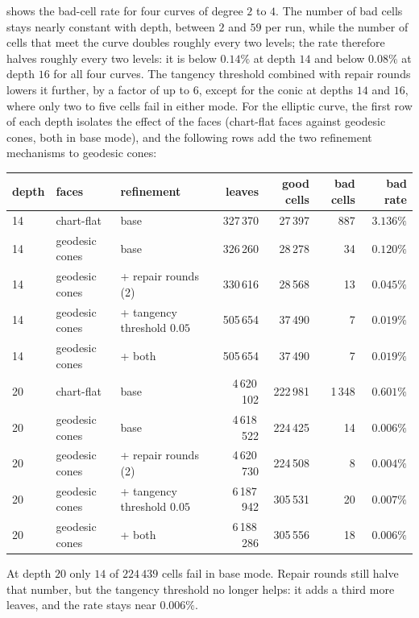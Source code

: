 \documentclass[11pt]{article}
\theoremstyle{plain}
\theoremstyle{definition}
\theoremstyle{remark}
\begin{document}
 shows the bad-cell rate for four curves of degree $2$ to
$4$. The number of bad cells stays nearly constant with depth, between $2$
and $59$ per run, while the number of cells that meet the curve doubles
roughly every two levels; the rate therefore halves roughly every two
levels: it is below $0.14\%$ at depth $14$ and below $0.08\%$ at depth $16$
for all four curves. The tangency threshold
combined with repair rounds lowers it further, by a factor of up to $6$,
except for the conic at depths $14$ and $16$, where only two to five
cells fail in either mode. For the elliptic curve, the first row of each
depth isolates the effect of the faces (chart-flat faces against geodesic
cones, both in base mode), and the following rows add the two refinement
mechanisms to geodesic cones:
\begin{center}
\small
\begin{tabular}{@{}lllrrrr@{}}
\toprule
depth & faces & refinement & leaves & good cells & bad cells & bad rate \\
\midrule
14 & chart-flat & base & 327\,370 & 27\,397 & 887 & $3.136\%$ \\
14 & geodesic cones & base & 326\,260 & 28\,278 & 34 & $0.120\%$ \\
14 & geodesic cones & + repair rounds (2) & 330\,616 & 28\,568 & 13 & $0.045\%$ \\
14 & geodesic cones & + tangency threshold $0.05$ & 505\,654 & 37\,490 & 7 & $0.019\%$ \\
14 & geodesic cones & + both & 505\,654 & 37\,490 & 7 & $0.019\%$ \\
\midrule
20 & chart-flat & base & 4\,620\,102 & 222\,981 & 1\,348 & $0.601\%$ \\
20 & geodesic cones & base & 4\,618\,522 & 224\,425 & 14 & $0.006\%$ \\
20 & geodesic cones & + repair rounds (2) & 4\,620\,730 & 224\,508 & 8 & $0.004\%$ \\
20 & geodesic cones & + tangency threshold $0.05$ & 6\,187\,942 & 305\,531 & 20 & $0.007\%$ \\
20 & geodesic cones & + both & 6\,188\,286 & 305\,556 & 18 & $0.006\%$ \\
\bottomrule
\end{tabular}
\end{center}
At depth $20$ only $14$ of $224\,439$ cells fail in base mode.
Repair rounds still halve that number, but the
tangency threshold no longer helps: it adds a third more leaves, and the rate stays near
$0.006\%$.
\end{document}
